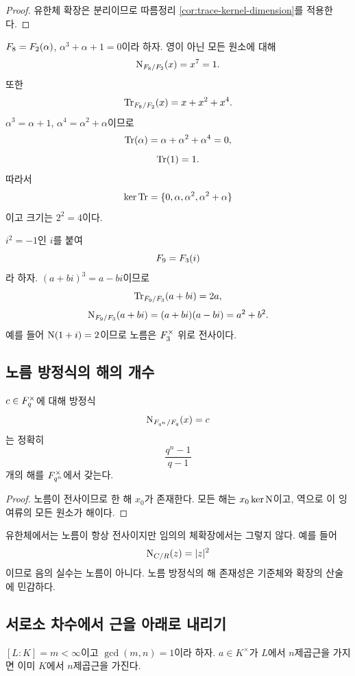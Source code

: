 \begin{proof}
유한체 확장은 분리이므로 따름정리
\ref{cor:trace-kernel-dimension}를 적용한다.
\end{proof}

\begin{example}[$\F_8/\F_2$]
$F_8=F_2(\alpha)$, $\alpha^3+\alpha+1=0$이라 하자.
영이 아닌 모든 원소에 대해
\[
  \operatorname{N}_{F_8/F_2}(x)=x^7=1.
\]
또한
\[
  \operatorname{Tr}_{F_8/F_2}(x)=x+x^2+x^4.
\]
$\alpha^3=\alpha+1$, $\alpha^4=\alpha^2+\alpha$이므로
\[
  \operatorname{Tr}(\alpha)=\alpha+\alpha^2+\alpha^4=0,
\]
\[
  \operatorname{Tr}(1)=1.
\]
따라서
\[
  \ker\operatorname{Tr}
  =\{0,\alpha,\alpha^2,\alpha^2+\alpha\}
\]
이고 크기는 $2^2=4$이다.
\end{example}

\begin{example}[$\F_9/\F_3$]
$i^2=-1$인 $i$를 붙여
\[
  F_9=F_3(i)
\]
라 하자. $(a+bi)^3=a-bi$이므로
\[
  \operatorname{Tr}_{F_9/F_3}(a+bi)=2a,
\]
\[
  \operatorname{N}_{F_9/F_3}(a+bi)
  =(a+bi)(a-bi)=a^2+b^2.
\]
예를 들어 $\operatorname{N}(1+i)=2$이므로 노름은 $F_3^\times$ 위로 전사이다.
\end{example}

\subsection{노름 방정식의 해의 개수}

\begin{corollary}
\label{cor:finite-field-norm-fibers}
$c\in F_q^\times$에 대해 방정식
\[
  \operatorname{N}_{F_{q^n}/F_q}(x)=c
\]
는 정확히
\[
  \frac{q^n-1}{q-1}
\]
개의 해를 $F_{q^n}^\times$에서 갖는다.
\end{corollary}

\begin{proof}
노름이 전사이므로 한 해 $x_0$가 존재한다. 모든 해는
$x_0\ker\operatorname{N}$이고, 역으로 이 잉여류의 모든 원소가 해이다.
\end{proof}

\begin{pitfall}
유한체에서는 노름이 항상 전사이지만 임의의 체확장에서는 그렇지 않다.
예를 들어
\[
  \operatorname{N}_{C/R}(z)=|z|^2
\]
이므로 음의 실수는 노름이 아니다. 노름 방정식의 해 존재성은
기준체와 확장의 산술에 민감하다.
\end{pitfall}

\subsection{서로소 차수에서 근을 아래로 내리기}

\begin{theorem}
\label{thm:coprime-degree-root-descent}
$[L:K]=m<\infty$이고 $\gcd(m,n)=1$이라 하자.
$a\in K^\times$가 $L$에서 $n$제곱근을 가지면 이미 $K$에서
$n$제곱근을 가진다.
\end{theorem}

